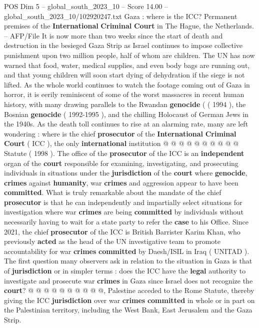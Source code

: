 \begin{textsample}{POS Dim 5 – global\_south\_2023\_10 – Score 14.00 – global\_south\_2023\_10/102920247.txt}  \label{ex:f5_pos_384}
Gaza : where is the ICC?
Permanent premises of the \textbf{International} \textbf{Criminal} \textbf{Court} in The Hague, the Netherlands. -- AFP/File It is now more than two weeks since the start of death and destruction in the besieged Gaza Strip as Israel continues to impose collective punishment upon two million people, half of whom are children.
The UN has now warned that food, water, medical supplies, and even body bags are running out, and that young children will soon start dying of dehydration if the siege is not lifted.
As the whole world continues to watch the footage coming out of Gaza in horror, it is eerily reminiscent of some of the worst massacres in recent human history, with many drawing parallels to the Rwandan \textbf{genocide} ( ( 1994 ), the Bosnian \textbf{genocide} ( 1992-1995 ), and the chilling Holocaust of German Jews in the 1940s.
As the death toll continues to rise at an alarming rate, many are left wondering : where is the chief \textbf{prosecutor} of the \textbf{International} \textbf{Criminal} \textbf{Court} ( ICC ), the only \textbf{international} institution @ @ @ @ @ @ @ @ @ @ Statute ( 1998 ).
The office of the \textbf{prosecutor} of the ICC is an \textbf{independent} organ of the \textbf{court} responsible for examining, investigating, and prosecuting individuals in situations under the \textbf{jurisdiction} of the \textbf{court} where \textbf{genocide}, \textbf{crimes} against \textbf{humanity}, war \textbf{crimes} and aggression appear to have been \textbf{committed}.
What is truly remarkable about the mandate of the chief \textbf{prosecutor} is that he can independently and impartially select situations for investigation where war \textbf{crimes} are being \textbf{committed} by individuals without necessarily having to wait for a state party to refer the \textbf{case} to his Office.
Since 2021, the chief \textbf{prosecutor} of the ICC is British Barrister Karim Khan, who previously \textbf{acted} as the head of the UN investigative team to promote accountability for war \textbf{crimes} \textbf{committed} by Daesh/ISIL in Iraq ( UNITAD ).
The first question many observers ask in relation to the situation in Gaza is that of \textbf{jurisdiction} or in simpler terms : does the ICC have the \textbf{legal} authority to investigate and prosecute war \textbf{crimes} in Gaza since Israel does not recognize the \textbf{court}? @ @ @ @ @ @ @ @ @ @, Palestine acceded to the Rome Statute, thereby giving the ICC \textbf{jurisdiction} over war \textbf{crimes} \textbf{committed} in whole or in part on the Palestinian territory, including the West Bank, East Jerusalem and the Gaza Strip.

\end{textsample}
